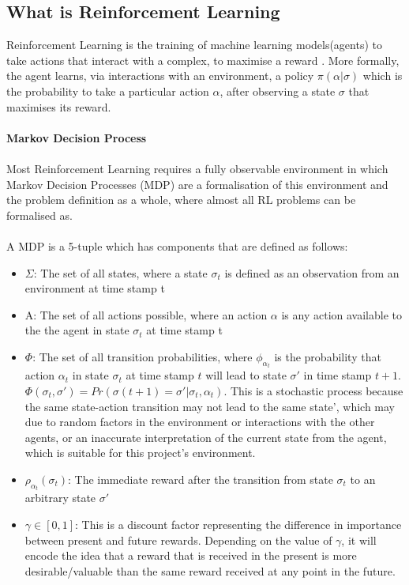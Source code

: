 \documentclass[ %
                    author={Ashwinder Khurana},
                supervisor={Prof Dave Cliff},
                    degree={MEng},
                     title={The Deeply Reinforced Trader},
                  subtitle={},
                      type={enterprise},
                      year={2020} ]{dissertation}
\begin{document}
\subsection{What is Reinforcement Learning}
Reinforcement Learning is the training of machine learning models(agents) to take actions that interact with a complex, to maximise a reward {}. More formally, the agent learns, via interactions with an environment, a policy $\pi(\alpha|\sigma)$ which is the probability to take a particular action $\alpha$, after observing a state $\sigma$ that maximises its reward. 
{\color{red}{state all the sources for the derivations in the entire chapter}}
\\
\\
\noindent
\textbf{Markov Decision Process}
\\
\\
Most Reinforcement Learning requires a fully observable environment in which Markov Decision Processes (MDP) are a formalisation of this environment and the problem definition as a whole, where almost all RL problems can be formalised as. 
\\
\\
\noindent 
A MDP is a 5-tuple which has components that are defined as follows:
\begin{itemize}
\item $\Sigma$: The set of all states, where a state $\sigma_t$ is defined as an observation from an 
environment at time stamp t
\item  A: The set of all actions possible, where an action $\alpha$ is any action available to the the agent in state $\sigma_t$ at time stamp t
\item $\Phi$: The set of all transition probabilities, where $\phi_{\alpha_t}$ is the probability that action $\alpha_t$ in state $\sigma_t$ at time stamp $t$ will lead to state $\sigma'$ in time stamp $t+1$. 
$\Phi(\sigma_t, \sigma') = Pr(\sigma(t+1) = \sigma' | \sigma_t, \alpha_t)$. This is a stochastic process because the same state-action transition may not lead to the same state', which may due to random factors in the environment or interactions with the other agents, or an inaccurate interpretation of the current state from the agent, which is suitable for this project's environment. 
\item $\rho_{\alpha_t}(\sigma_t)$: The immediate reward after the transition from state $\sigma_t$ to an arbitrary state $\sigma'$ 
\item $\gamma \in [0,1]$: This is a discount factor representing the difference in importance between present and future rewards. Depending on the value of $\gamma$, it will encode the idea that a reward that is received in the present is more desirable/valuable than the same reward received at any point in the future. 



\end{itemize}
\end{document}
